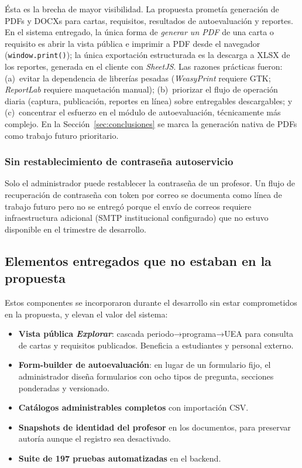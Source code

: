 Ésta es la brecha de mayor visibilidad. La propuesta prometía generación de PDFs y DOCXs para cartas, requisitos, resultados de autoevaluación y reportes. En el sistema entregado, la única forma de \emph{generar un PDF} de una carta o requisito es abrir la vista pública e imprimir a PDF desde el navegador (\texttt{window.print()}); la única exportación estructurada es la descarga a XLSX de los reportes, generada en el cliente con \emph{SheetJS}. Las razones prácticas fueron: (a)~evitar la dependencia de librerías pesadas (\emph{WeasyPrint} requiere GTK; \emph{ReportLab} requiere maquetación manual); (b)~priorizar el flujo de operación diaria (captura, publicación, reportes en línea) sobre entregables descargables; y (c)~concentrar el esfuerzo en el módulo de autoevaluación, técnicamente más complejo. En la Sección~\ref{sec:conclusiones} se marca la generación nativa de PDFs como trabajo futuro prioritario.

\subsubsection{Sin restablecimiento de contraseña autoservicio}

Solo el administrador puede restablecer la contraseña de un profesor. Un flujo de recuperación de contraseña con token por correo se documenta como línea de trabajo futuro pero no se entregó porque el envío de correos requiere infraestructura adicional (SMTP institucional configurado) que no estuvo disponible en el trimestre de desarrollo.

\subsection{Elementos entregados que no estaban en la propuesta}

Estos componentes se incorporaron durante el desarrollo sin estar comprometidos en la propuesta, y elevan el valor del sistema:

\begin{itemize}
    \item \textbf{Vista pública \emph{Explorar}}: cascada periodo→programa→UEA para consulta de cartas y requisitos publicados. Beneficia a estudiantes y personal externo.
    \item \textbf{Form-builder de autoevaluación}: en lugar de un formulario fijo, el administrador diseña formularios con ocho tipos de pregunta, secciones ponderadas y versionado.
    \item \textbf{Catálogos administrables completos} con importación CSV.
    \item \textbf{Snapshots de identidad del profesor} en los documentos, para preservar autoría aunque el registro sea desactivado.
    \item \textbf{Suite de 197 pruebas automatizadas} en el backend.
\end{itemize}

